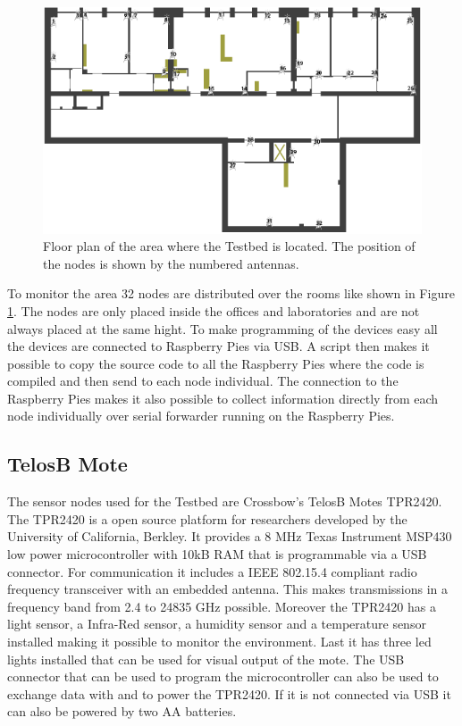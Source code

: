\begin{figure}[htbp]
	\centering
    \includegraphics[scale=0.75]{content/images/Testbed}
   	\caption{Floor plan of the area where the Testbed is located. The position of the nodes is shown by the numbered antennas.}
    \label{fig:testbed}
\end{figure}

To monitor the area 32 nodes are distributed over the rooms like shown in Figure \ref{fig:testbed}. The nodes are only placed inside the offices and laboratories and are not always placed at the same hight. To make programming of the devices easy all the devices are connected to Raspberry Pies via USB. A script then makes it possible to copy the source code to all the Raspberry Pies where the code is compiled and then send to each node individual. The connection to the Raspberry Pies makes it also possible to collect information directly from each node individually over serial forwarder running on the Raspberry Pies.

\subsection{TelosB Mote}
The sensor nodes used for the Testbed are Crossbow's TelosB Motes TPR2420. The TPR2420 is a open source platform for researchers developed by the University of California, Berkley. It provides a 8 MHz Texas Instrument MSP430 low power microcontroller with 10kB RAM that is programmable via a USB connector. For communication it includes a IEEE 802.15.4 compliant radio frequency transceiver with an embedded antenna. This makes transmissions in a frequency band from 2.4 to 24835 GHz possible. Moreover the TPR2420 has a light sensor, a Infra-Red sensor, a humidity sensor and a temperature sensor installed making it possible to monitor the environment. Last it has three led lights installed that can be used for visual output of the mote. The USB connector that can be used to program the microcontroller can also be used to exchange data with and to power the TPR2420. If it is not connected via USB it can also be powered by two AA batteries. \cite{telosb}


